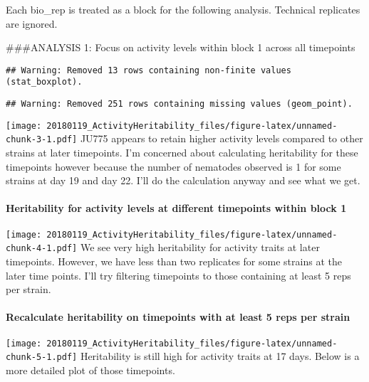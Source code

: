 \documentclass[]{article}
\let\oldparagraph\paragraph
\renewcommand{\paragraph}[1]{\oldparagraph{#1}\mbox{}}
\begin{document}
 Each bio\_rep is treated as a block for the following analysis.
Technical replicates are ignored.

\#\#\#ANALYSIS 1: Focus on activity levels within block 1 across all
timepoints

\begin{verbatim}
## Warning: Removed 13 rows containing non-finite values (stat_boxplot).
\end{verbatim}

\begin{verbatim}
## Warning: Removed 251 rows containing missing values (geom_point).
\end{verbatim}

\texttt{[image: 20180119\_ActivityHeritability\_files/figure-latex/unnamed-chunk-3-1.pdf]}
JU775 appears to retain higher activity levels compared to other strains
at later timepoints. I'm concerned about calculating heritability for
these timepoints however because the number of nematodes observed is 1
for some strains at day 19 and day 22. I'll do the calculation anyway
and see what we get.

\hypertarget{heritability-for-activity-levels-at-different-timepoints-within-block-1}{%
\paragraph{Heritability for activity levels at different timepoints
within block
1}\label{heritability-for-activity-levels-at-different-timepoints-within-block-1}}

\texttt{[image: 20180119\_ActivityHeritability\_files/figure-latex/unnamed-chunk-4-1.pdf]}
We see very high heritability for activity traits at later timepoints.
However, we have less than two replicates for some strains at the later
time points. I'll try filtering timepoints to those containing at least
5 reps per strain.

\hypertarget{recalculate-heritability-on-timepoints-with-at-least-5-reps-per-strain}{%
\paragraph{Recalculate heritability on timepoints with at least 5 reps
per
strain}\label{recalculate-heritability-on-timepoints-with-at-least-5-reps-per-strain}}

\texttt{[image: 20180119\_ActivityHeritability\_files/figure-latex/unnamed-chunk-5-1.pdf]}
Heritability is still high for activity traits at 17 days. Below is a
more detailed plot of those timepoints.
\end{document}
